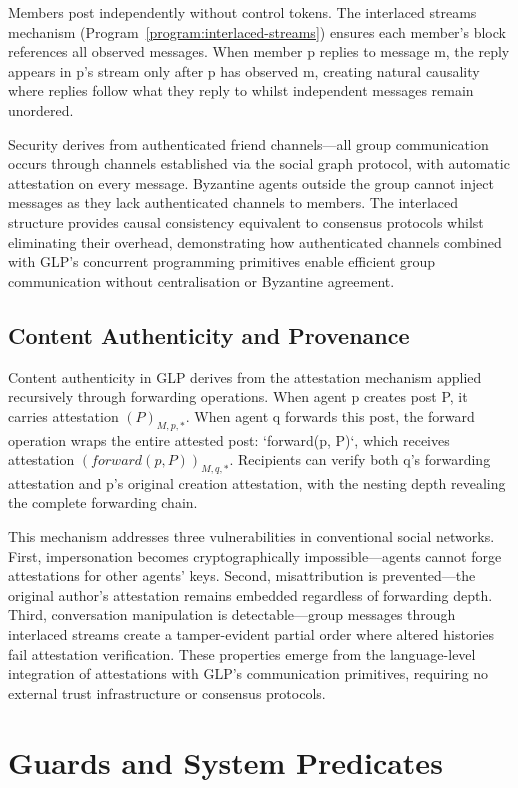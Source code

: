 \documentclass[runningheads,thm-restate]{llncs}
\begin{document}
Members post independently without control tokens. The interlaced streams mechanism (Program~\ref{program:interlaced-streams}) ensures each member's block references all observed messages. When member p replies to message m, the reply appears in p's stream only after p has observed m, creating natural causality where replies follow what they reply to whilst independent messages remain unordered.

Security derives from authenticated friend channels—all group communication occurs through channels established via the social graph protocol, with automatic attestation on every message. Byzantine agents outside the group cannot inject messages as they lack authenticated channels to members. The interlaced structure provides causal consistency equivalent to consensus protocols whilst eliminating their overhead, demonstrating how authenticated channels combined with GLP's concurrent programming primitives enable efficient group communication without centralisation or Byzantine agreement.

\subsection{Content Authenticity and Provenance}

Content authenticity in GLP derives from the attestation mechanism applied recursively through forwarding operations. When agent p creates post P, it carries attestation $(P)_{M,p,*}$. When agent q forwards this post, the forward operation wraps the entire attested post: `forward(p, P)`, which receives attestation $(forward(p,P))_{M,q,*}$. Recipients can verify both q's forwarding attestation and p's original creation attestation, with the nesting depth revealing the complete forwarding chain.

This mechanism addresses three vulnerabilities in conventional social networks. First, impersonation becomes cryptographically impossible—agents cannot forge attestations for other agents' keys. Second, misattribution is prevented—the original author's attestation remains embedded regardless of forwarding depth. Third, conversation manipulation is detectable—group messages through interlaced streams create a tamper-evident partial order where altered histories fail attestation verification. These properties emerge from the language-level integration of attestations with GLP's communication primitives, requiring no external trust infrastructure or consensus protocols.

\section{Guards and System Predicates}\label{appendix:guards-system}
\end{document}
